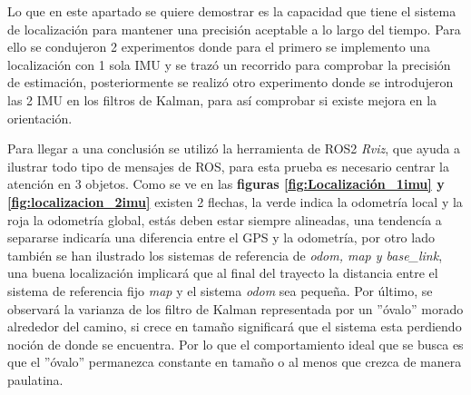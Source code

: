 Lo que en este apartado se quiere demostrar es la capacidad que tiene el sistema de localización para mantener una precisión aceptable a lo 
largo del tiempo. Para ello se condujeron 2 experimentos donde para el primero se implemento una localización con 1 sola IMU y se trazó un 
recorrido para comprobar la precisión de estimación, posteriormente se realizó otro experimento donde se introdujeron las 2 IMU en los filtros 
de Kalman, para así comprobar si existe mejora en la orientación. 

Para llegar a una conclusión se utilizó la herramienta de ROS2 \textit{Rviz}, que ayuda a 
ilustrar todo tipo de mensajes de ROS, para esta prueba es necesario centrar la atención en 3 objetos. Como se ve en las 
\textbf{figuras \ref{fig:Localización_1imu} y \ref{fig:localizacion_2imu}} existen 2 flechas, la verde indica la odometría local y la roja la odometría global, estás deben estar siempre 
alineadas, una tendencía a separarse indicaría una diferencia entre el GPS y la odometría, por otro lado también se han 
ilustrado los sistemas de referencia de \textit{odom, map y base\_link}, una buena localización implicará que al final del trayecto la distancia 
entre el sistema de referencia fijo \textit{map} y el sistema \textit{odom} sea pequeña. Por último, se observará la varianza de los filtro de Kalman 
representada por un ''óvalo'' morado alrededor del camino, si crece en tamaño significará que el sistema 
esta perdiendo noción de donde se encuentra. Por lo que el comportamiento ideal que se busca es que el ''óvalo'' permanezca constante en tamaño o al menos que 
crezca de manera paulatina.


